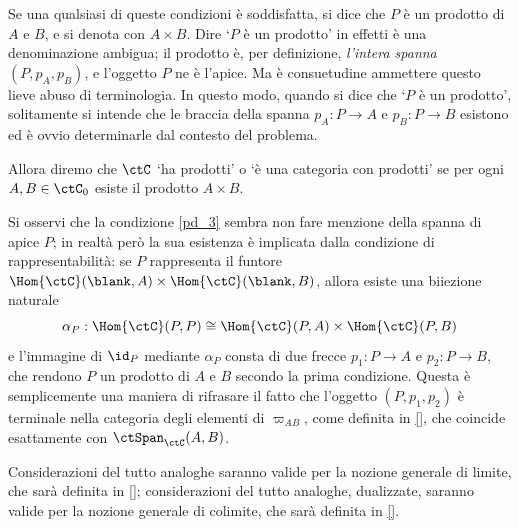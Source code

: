 \begin{remark}
	Se una qualsiasi di queste condizioni	è soddisfatta, si dice che \(P\) è un prodotto di \(A\) e \(B\), e si denota con \(A\times B\). Dire `\(P\) è un prodotto' in effetti è una denominazione ambigua; il prodotto è, per definizione, \emph{l'intera spanna} \((P,p_A,p_B)\), e l'oggetto \(P\) ne è l'apice. Ma è consuetudine ammettere questo lieve abuso di terminologia. In questo modo, quando si dice che `\(P\) è un prodotto', solitamente si intende che le braccia della spanna \(p_A \colon P\to A\) e \(p_B \colon P \to B\) esistono ed è ovvio determinarle dal contesto del problema.

	Allora diremo che \(\ctC\) `ha prodotti' o `è una categoria con prodotti' se per ogni \(A,B\in\ctC_0\) esiste il prodotto \(A\times B\).

	Si osservi che la condizione \ref{pd_3} sembra non fare menzione della spanna di apice \(P\); in realtà però la sua esistenza è implicata dalla condizione di rappresentabilità: se \(P\) rappresenta il funtore \(\Hom{\ctC}(\blank,A)\times\Hom{\ctC}(\blank,B)\), allora esiste una biiezione naturale
	\[\alpha_P : \Hom{\ctC}(P,P)\cong\Hom{\ctC}(P,A)\times\Hom{\ctC}(P,B)\]
	e l'immagine di \(\id_P\) mediante \(\alpha_P\) consta di due frecce \(p_1 \colon P\to A\) e \(p_2 \colon P\to B\), che rendono \(P\) un prodotto di \(A\) e \(B\) secondo la prima condizione. Questa è semplicemente una maniera di rifrasare il fatto che l'oggetto \((P,p_1,p_2)\) è terminale nella categoria degli elementi di \(\varpi_{AB}\), come definita in \ref{}, che coincide esattamente con \(\ctSpan_\ctC(A,B)\).

	Considerazioni del tutto analoghe saranno valide per la nozione generale di limite, che sarà definita in \ref{}; considerazioni del tutto analoghe, dualizzate, saranno valide per la nozione generale di colimite, che sarà definita in \ref{}.
\end{remark}
